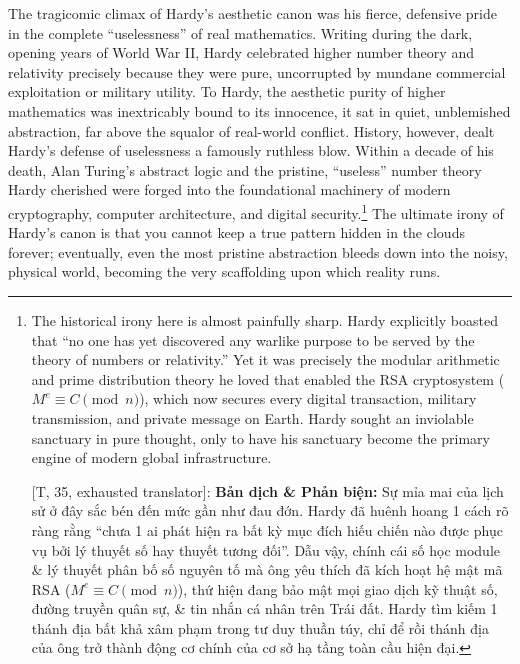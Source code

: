 \documentclass[11pt]{article}
\begin{document}
The tragicomic climax of Hardy's aesthetic canon was his fierce, defensive pride in the complete ``uselessness'' of real mathematics. Writing during the dark, opening years of World War II, Hardy celebrated higher number theory and relativity precisely because they were pure, uncorrupted by mundane commercial exploitation or military utility. To Hardy, the aesthetic purity of higher mathematics was inextricably bound to its innocence, it sat in quiet, unblemished abstraction, far above the squalor of real-world conflict. History, however, dealt Hardy's defense of uselessness a famously ruthless blow. Within a decade of his death, Alan Turing's abstract logic and the pristine, ``useless'' number theory Hardy cherished were forged into the foundational machinery of modern cryptography, computer architecture, and digital security.\footnote{The historical irony here is almost painfully sharp. Hardy explicitly boasted that ``no one has yet discovered any warlike purpose to be served by the theory of numbers or relativity.'' Yet it was precisely the modular arithmetic and prime distribution theory he loved that enabled the RSA cryptosystem ($M^e \equiv C \pmod{n}$), which now secures every digital transaction, military transmission, and private message on Earth. Hardy sought an inviolable sanctuary in pure thought, only to have his sanctuary become the primary engine of modern global infrastructure.
	
	\textsf{[T, 35, exhausted translator]:} \textbf{Bản dịch \& Phản biện:} Sự mỉa mai của lịch sử ở đây sắc bén đến mức gần như đau đớn. Hardy đã huênh hoang 1 cách rõ ràng rằng ``chưa 1 ai phát hiện ra bất kỳ mục đích hiếu chiến nào được phục vụ bởi lý thuyết số hay thuyết tương đối''. Dẫu vậy, chính cái số học module \& lý thuyết phân bố số nguyên tố mà ông yêu thích đã kích hoạt hệ mật mã RSA ($M^e \equiv C \pmod{n}$), thứ hiện đang bảo mật mọi giao dịch kỹ thuật số, đường truyền quân sự, \& tin nhắn cá nhân trên Trái đất. Hardy tìm kiếm 1 thánh địa bất khả xâm phạm trong tư duy thuần túy, chỉ để rồi thánh địa của ông trở thành động cơ chính của cơ sở hạ tầng toàn cầu hiện đại.} The ultimate irony of Hardy's canon is that you cannot keep a true pattern hidden in the clouds forever; eventually, even the most pristine abstraction bleeds down into the noisy, physical world, becoming the very scaffolding upon which reality runs.
\end{document}
